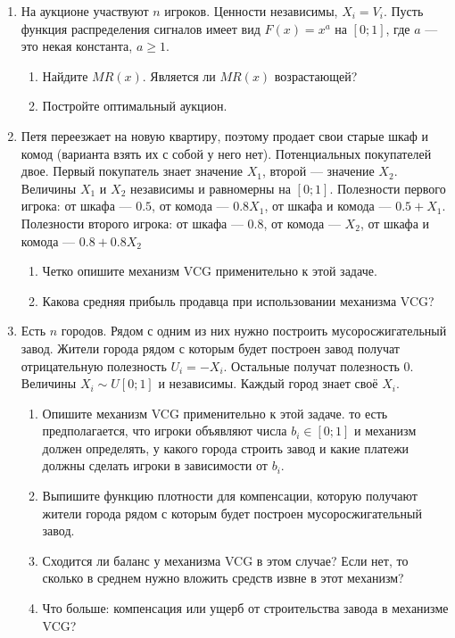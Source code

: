 \begin{enumerate}

\item На аукционе участвуют $ n $ игроков. Ценности независимы, $ X_{i}=V_{i}$. Пусть функция распределения сигналов имеет вид $ F(x)=x^{a} $ на $ [0;1] $, где $ a $ — это некая константа, $ a\geq 1 $.
\begin{enumerate}
\item Найдите $ MR(x) $. Является ли $ MR(x) $ возрастающей?
\item Постройте оптимальный аукцион.
\end{enumerate}

\item Петя переезжает на новую квартиру, поэтому продает свои старые шкаф и комод (варианта взять их с собой у него нет).  Потенциальных покупателей двое. Первый покупатель знает значение $ X_{1} $, второй — значение $ X_{2} $. Величины  $ X_{1} $ и  $ X_{2} $ независимы и равномерны на $ [0;1] $. Полезности первого игрока: от шкафа — $ 0.5 $, от комода — $ 0.8X_{1} $, от шкафа и комода — $ 0.5+X_{1} $. Полезности второго игрока: от шкафа — $ 0.8 $, от комода — $ X_{2} $, от шкафа и комода — $ 0.8+0.8X_{2}$
\begin{enumerate}
\item Четко опишите механизм VCG применительно к этой задаче.
\item Какова средняя прибыль продавца при использовании механизма VCG?
\end{enumerate}

\item Есть $ n $ городов. Рядом с одним из них нужно построить мусоросжигательный завод. Жители города рядом с которым будет построен завод получат отрицательную полезность $ U_{i}=-X_{i} $. Остальные получат полезность 0. Величины $ X_{i}\sim U[0;1] $ и независимы. Каждый город знает своё $ X_{i} $.
\begin{enumerate}
\item Опишите механизм VCG применительно к этой задаче. то есть предполагается, что игроки объявляют числа $ b_{i}\in [0;1] $ и механизм должен определять, у какого города строить завод и какие платежи должны сделать игроки в зависимости от $ b_{i} $.
\item Выпишите функцию плотности для компенсации, которую получают жители города рядом с которым будет построен мусоросжигательный завод.
\item Сходится ли баланс у механизма VCG в этом случае? Если нет, то сколько в среднем нужно вложить средств извне в этот механизм?
\item Что больше: компенсация или ущерб от строительства завода в механизме VCG?
\end{enumerate}



\end{enumerate}
